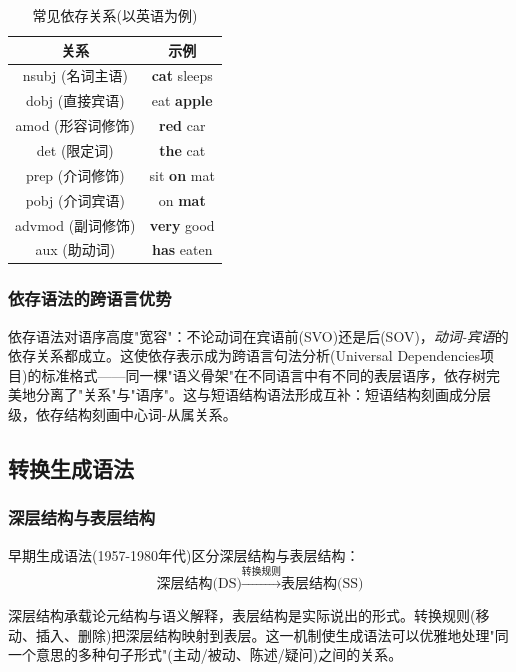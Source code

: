 \begin{table}[H]
\centering
\caption{常见依存关系(以英语为例)}
\begin{tabulary}{\textwidth}{@{}CC@{}}
\toprule
\textbf{关系} & \textbf{示例} \\
\midrule
nsubj (名词主语) & \textbf{cat} sleeps \\
dobj (直接宾语) & eat \textbf{apple} \\
amod (形容词修饰) & \textbf{red} car \\
det (限定词) & \textbf{the} cat \\
prep (介词修饰) & sit \textbf{on} mat \\
pobj (介词宾语) & on \textbf{mat} \\
advmod (副词修饰) & \textbf{very} good \\
aux (助动词) & \textbf{has} eaten \\
\bottomrule
\end{tabulary}
\end{table}

\subsubsection{依存语法的跨语言优势}

依存语法对语序高度"宽容"：不论动词在宾语前(SVO)还是后(SOV)，\emph{动词-宾语}的依存关系都成立。这使依存表示成为跨语言句法分析(Universal Dependencies项目)的标准格式——同一棵"语义骨架"在不同语言中有不同的表层语序，依存树完美地分离了"关系"与"语序"。这与短语结构语法形成互补：短语结构刻画成分层级，依存结构刻画中心词-从属关系。

\subsection{转换生成语法}

\subsubsection{深层结构与表层结构}

早期生成语法(1957-1980年代)区分深层结构与表层结构：
\begin{equation}
    \text{深层结构(DS)} \xrightarrow{\text{转换规则}} \text{表层结构(SS)}
\end{equation}

深层结构承载论元结构与语义解释，表层结构是实际说出的形式。转换规则(移动、插入、删除)把深层结构映射到表层。这一机制使生成语法可以优雅地处理"同一个意思的多种句子形式"(主动/被动、陈述/疑问)之间的关系。

